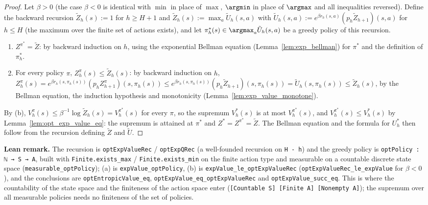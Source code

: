 \begin{proof}
\leanok
Let $\beta > 0$ (the case $\beta < 0$ is identical with $\min$ in place of $\max$, $\argmin$ in
place of $\argmax$ and all inequalities reversed). Define the backward recursion
$\tilde Z_h(s) := 1$ for $h \ge H + 1$ and
$\tilde Z_h(s) := \max_a \tilde U_h(s, a)$ with
$\tilde U_h(s, a) := e^{\beta r_h(s, a)} (p_h \tilde Z_{h+1})(s, a)$ for $h \le H$ (the maximum
over the finite set of actions exists), and let $\pi^*_h(s) \in \argmax_a \tilde U_h(s, a)$ be a
greedy policy of this recursion.
\begin{enumerate}
  \item[(a)] $Z^{\pi^*} = \tilde Z$: by backward induction on $h$, using the exponential
        Bellman equation (Lemma~\ref{lem:exp_bellman}) for $\pi^*$ and the definition of $\pi^*_h$.
  \item[(b)] For every policy $\pi$, $Z^\pi_h(s) \le \tilde Z_h(s)$: by backward induction on $h$,
        $Z^\pi_h(s) = e^{\beta r_h(s, \pi_h(s))}(p_h Z^\pi_{h+1})(s, \pi_h(s))
        \le e^{\beta r_h(s, \pi_h(s))}(p_h \tilde Z_{h+1})(s, \pi_h(s)) = \tilde U_h(s, \pi_h(s))
        \le \tilde Z_h(s)$, by the Bellman equation, the induction hypothesis and monotonicity
        (Lemma~\ref{lem:exp_value_monotone}).
\end{enumerate}
By (b), $V^\pi_h(s) \le \beta^{-1}\log \tilde Z_h(s) = V^{\pi^*}_h(s)$ for every $\pi$, so the supremum
$V^*_h(s)$ is at most $V^{\pi^*}_h(s)$, and $V^{\pi^*}_h(s) \le V^*_h(s)$ by
Lemma~\ref{lem:opt_exp_value_eq}: the supremum is attained at $\pi^*$ and
$Z^* = Z^{\pi^*} = \tilde Z$. The Bellman equation and the formula for $U^*_h$ then follow from
the recursion defining $\tilde Z$ and $\tilde U$.
\end{proof}

\textbf{Lean remark.} The recursion is \texttt{optExpValueRec} / \texttt{optExpQRec} (a
well-founded recursion on \texttt{H - h}) and the greedy policy is
\texttt{optPolicy : ℕ → S → A}, built with \texttt{Finite.exists\_max} /
\texttt{Finite.exists\_min} on the finite action type and measurable on a countable discrete
state space (\texttt{measurable\_optPolicy}); (a) is \texttt{expValue\_optPolicy}, (b) is
\texttt{expValue\_le\_optExpValueRec} (\texttt{optExpValueRec\_le\_expValue} for $\beta < 0$),
and the conclusions are \texttt{optEntropicValue\_eq}, \texttt{optExpValue\_eq\_optExpValueRec}
and \texttt{optExpValue\_succ\_eq}. This is where the countability of the state space and the
finiteness of the action space enter (\texttt{[Countable S] [Finite A] [Nonempty A]}); the
supremum over all measurable policies needs no finiteness of the set of policies.

